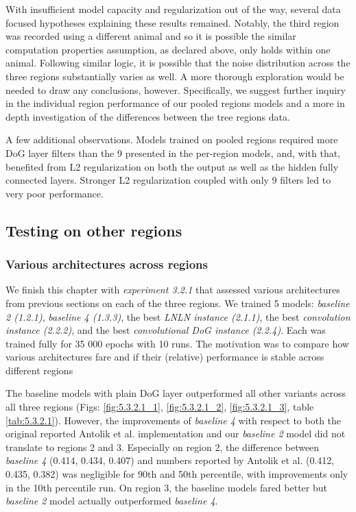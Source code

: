 With insufficient model capacity and regularization out of the way, several data focused hypotheses explaining these results remained. Notably, the third region was recorded using a different animal and so it is possible the similar computation properties assumption, as declared above, only holds within one animal. Following similar logic, it is possible that the noise distribution across the three regions substantially varies as well. A more thorough exploration would be needed to draw any conclusions, however. Specifically, we suggest further inquiry in the individual region performance of our pooled regions models and a more in depth investigation of the differences between the tree regions data.

A few additional observations. Models trained on pooled regions required more DoG layer filters than the 9 presented in the per-region models, and, with that, benefited from L2 regularization on both the output as well as the hidden fully connected layers. Stronger L2 regularization coupled with only 9 filters led to very poor performance. 

\subsection{Testing on other regions}\label{ch:5.3.2}
\subsubsection{Various architectures across regions}

We finish this chapter with \textit{experiment 3.2.1} that assessed various architectures from previous sections on each of the three regions. We trained 5 models: \textit{baseline 2 (1.2.1)}, \textit{baseline 4 (1.3.3)}, the best \textit{LNLN instance (2.1.1)}, the best \textit{convolution instance (2.2.2)}, and the best \textit{convolutional DoG instance (2.2.4)}. Each was trained fully for 35 000 epochs with 10 runs. The motivation was to compare how various architectures fare and if their (relative) performance is stable across different regions

The baseline models with plain DoG layer outperformed all other variants across all three regions (Figs: \ref{fig:5.3.2.1_1}, \ref{fig:5.3.2.1_2}, \ref{fig:5.3.2.1_3}, table \ref{tab:5.3.2.1}). However, the improvements of \textit{baseline 4} with respect to both the original reported Antolik et al. implementation and our \textit{baseline 2} model did not translate to regions 2 and 3. Especially on region 2, the difference between \textit{baseline 4} (0.414, 0.434, 0.407) and numbers reported by Antolik et al. (0.412, 0.435, 0.382) was negligible for 90th and 50th percentile, with improvements only in the 10th percentile run. On region 3, the baseline models fared better but \textit{baseline 2} model actually outperformed \textit{baseline 4}.

